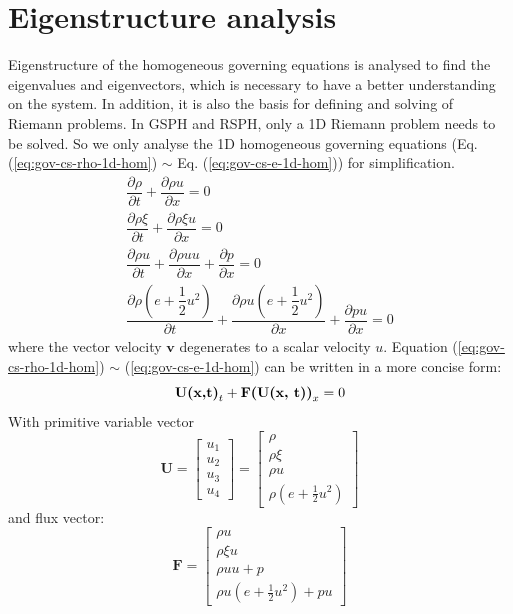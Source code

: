 \section{Eigenstructure analysis}

Eigenstructure of the homogeneous governing equations is analysed to find the eigenvalues and eigenvectors, which is necessary to have a better understanding on the system. In addition, it is also the basis for defining and solving of Riemann problems. In GSPH and RSPH, only a 1D Riemann problem needs to be solved. So we only analyse the 1D homogeneous governing equations (Eq. (\ref{eq:gov-cs-rho-1d-hom}) $\sim$ Eq. (\ref{eq:gov-cs-e-1d-hom})) for simplification.
\begin{align}
\dfrac{\partial \rho}{\partial t} + \dfrac{\partial \rho u} {\partial x}= 0 \label{eq:gov-cs-rho-1d-hom} \\
\dfrac{\partial \rho \xi}{\partial t} + \dfrac{\partial \rho \xi u} {\partial x}= 0 \label{eq:gov-cs-ks-1d-hom}\\
\dfrac{\partial \rho u}{\partial t} + \dfrac{\partial \rho u u} {\partial x} + \dfrac{\partial p} {\partial x}= 0 \label{eq:gov-cs-v-1d-hom} \\
\dfrac{\partial \rho (e+\dfrac{1}{2}u^2)}{\partial t} + \dfrac{\partial \rho u (e+\dfrac{1}{2}u^2) } {\partial x} + \dfrac{\partial pu} {\partial x} = 0 \label{eq:gov-cs-e-1d-hom}
\end{align}
where the vector velocity $\textbf{v}$ degenerates to a scalar velocity $u$. Equation (\ref{eq:gov-cs-rho-1d-hom}) $\sim$ (\ref{eq:gov-cs-e-1d-hom}) can be written in a more concise form:
\begin{equation}
\textbf{U(x,t)}_t + \textbf{F(\textbf{U}(x, t))}_x = 0
\end{equation}
With primitive variable vector
\begin{equation}
   \textbf{U}=\begin{bmatrix}
         u_1 \\
         u_2 \\
         u_3 \\
         u_4
     \end{bmatrix}
    =\begin{bmatrix}
         \rho \\
         \rho\xi \\
         \rho u   \\
         \rho(e+\frac{1}{2}u^2)
     \end{bmatrix}
\end{equation}
and flux vector: 
\begin{equation}
   \textbf{F}=\begin{bmatrix}
         \rho u \\
         \rho\xi u \\
         \rho u  u + p  \\
         \rho u(e+\frac{1}{2}u^2) + pu
     \end{bmatrix}
\end{equation}

